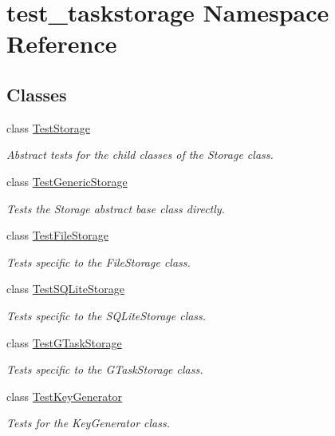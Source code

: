 \hypertarget{namespacetest__taskstorage}{
\section{test\-\_\-taskstorage \-Namespace \-Reference}
\label{namespacetest__taskstorage}
}
\subsection*{\-Classes}
\begin{DoxyCompactItemize}
\item 
class \hyperlink{classtest__taskstorage_1_1TestStorage}{\-Test\-Storage}
\begin{DoxyCompactList}\small\item\em \-Abstract tests for the child classes of the \-Storage class. \end{DoxyCompactList}\item 
class \hyperlink{classtest__taskstorage_1_1TestGenericStorage}{\-Test\-Generic\-Storage}
\begin{DoxyCompactList}\small\item\em \-Tests the \-Storage abstract base class directly. \end{DoxyCompactList}\item 
class \hyperlink{classtest__taskstorage_1_1TestFileStorage}{\-Test\-File\-Storage}
\begin{DoxyCompactList}\small\item\em \-Tests specific to the \-File\-Storage class. \end{DoxyCompactList}\item 
class \hyperlink{classtest__taskstorage_1_1TestSQLiteStorage}{\-Test\-S\-Q\-Lite\-Storage}
\begin{DoxyCompactList}\small\item\em \-Tests specific to the \-S\-Q\-Lite\-Storage class. \end{DoxyCompactList}\item 
class \hyperlink{classtest__taskstorage_1_1TestGTaskStorage}{\-Test\-G\-Task\-Storage}
\begin{DoxyCompactList}\small\item\em \-Tests specific to the \-G\-Task\-Storage class. \end{DoxyCompactList}\item 
class \hyperlink{classtest__taskstorage_1_1TestKeyGenerator}{\-Test\-Key\-Generator}
\begin{DoxyCompactList}\small\item\em \-Tests for the \-Key\-Generator class. \end{DoxyCompactList}\end{DoxyCompactItemize}
